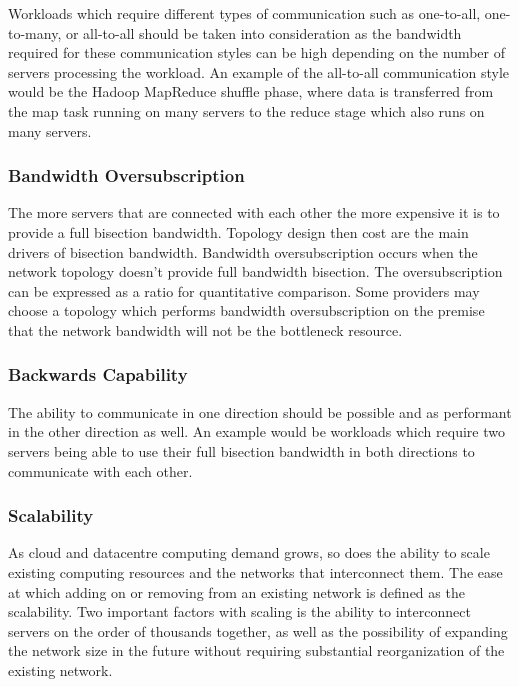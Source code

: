 \documentclass[12pt]{article}
\begin{document}
Workloads which require different types of communication such as one-to-all, one-to-many, or all-to-all should be taken into consideration as the bandwidth required for these communication styles can be high depending on the number of servers processing the workload. An example of the all-to-all communication style would be the Hadoop MapReduce shuffle phase, where data is transferred from the map task running on many servers to the reduce stage which also runs on many servers.

\subsubsection{Bandwidth Oversubscription} \label{ssub:bandwidth-oversubscription}

The more servers that are connected with each other the more expensive it is to provide a full bisection bandwidth. Topology design then cost are the main drivers of bisection bandwidth.  Bandwidth oversubscription occurs when the network topology doesn't provide full bandwidth bisection. The oversubscription can be expressed as a ratio for quantitative comparison. Some providers may choose a topology which performs bandwidth oversubscription on the premise that the network bandwidth will not be the bottleneck resource.


\subsubsection{Backwards Capability} \label{ssub:backwards-capability}

The ability to communicate in one direction should be possible and as performant in the other direction as well. An example would be workloads which require two servers being able to use their full bisection bandwidth in both directions to communicate with each other.


\subsubsection{Scalability} \label{ssub:net-scalability}

As cloud and datacentre computing demand grows, so does the ability to scale existing computing resources and the networks that interconnect them. The ease at which adding on or removing from an existing network is defined as the scalability. Two important factors with scaling is the ability to interconnect servers on the order of thousands together, as well as the possibility of expanding the network size in the future without requiring substantial reorganization of the existing network.
\end{document}
